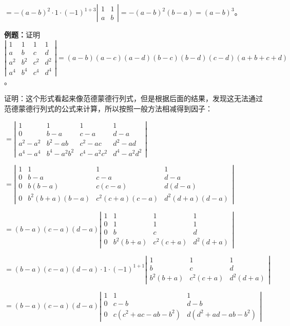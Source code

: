 \documentclass[UTF8, 12pt]{ctexart}
\begin{document}
$=-(a-b)^2\cdot1\cdot(-1)^{1+3}\left|\begin{array}{cc} 
    1 & 1 \\
    a & b
\end{array}\right|=-(a-b)^2(b-a)=(a-b)^3$。

\textbf{例题：}证明$\left|\begin{array}{cccc} 
    1 & 1 & 1 & 1 \\
    a & b & c & d \\
    a^2 & b^2 & c^2 & d^2 \\
    a^4 & b^4 & c^4 & d^4
\end{array}\right|=(a-b)(a-c)(a-d)(b-c)(b-d)(c-d)(a+b+c+d)$。

证明：这个形式看起来像范德蒙德行列式，但是根据后面的结果，发现这无法通过范德蒙德行列式的公式来计算，所以按照一般方法相减得到因子：

$=\left|\begin{array}{cccc} 
    1 & 1 & 1 & 1 \\
    0 & b-a & c-a & d-a \\
    a^2-a^2 & b^2-ab & c^2-ac & d^2-ad \\
    a^4-a^4 & b^4-a^2b^2 & c^4-a^2c^2 & d^4-a^2d^2
\end{array}\right|$

$=\left|\begin{array}{cccc} 
    1 & 1 & 1 & 1 \\
    0 & b-a & c-a & d-a \\
    0 & b(b-a) & c(c-a) & d(d-a) \\
    0 & b^2(b+a)(b-a) & c^2(c+a)(c-a) & d^2(d+a)(d-a)
\end{array}\right|$

$=(b-a)(c-a)(d-a)\left|\begin{array}{cccc} 
    1 & 1 & 1 & 1 \\
    0 & 1 & 1 & 1 \\
    0 & b & c & d \\
    0 & b^2(b+a) & c^2(c+a) & d^2(d+a)
\end{array}\right|$

$=(b-a)(c-a)(d-a)\cdot 1\cdot(-1)^{1+1}\left|\begin{array}{ccc}
    1 & 1 & 1 \\
    b & c & d \\
    b^2(b+a) & c^2(c+a) & d^2(d+a)
\end{array}\right|$

$=(b-a)(c-a)(d-a)\left|\begin{array}{ccc}
    1 & 1 & 1 \\
    0 & c-b & d-b \\
    0 & c(c^2+ac-ab-b^2) & d(d^2+ad-ab-b^2)
\end{array}\right|$
\end{document}
